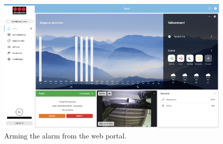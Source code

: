 \begin{figure}[!ht]
    \centering
    \includegraphics[width=\textwidth]{images/3-system/arming-web.png}
    \caption{Arming the alarm from the web portal.}
    \label{fig:web-arming}
\end{figure}

